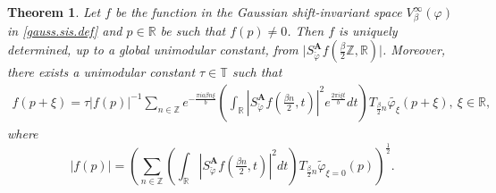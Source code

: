 \documentclass[11pt, reqno]{amsart}
\newtheorem{theorem}{Theorem}[section]
\newcommand{\Z}{\mathbb{Z}}
\newcommand{\R}{\mathbb{R}}
\newcommand{\T}{\mathbb{T}}
\numberwithin{equation}{section}
\begin{document}
\begin{theorem}\label{pr.gassian.thm1}
	Let $f$ be the function in the Gaussian shift-invariant space $V_{\beta}^{\infty}(\varphi)$ in \eqref{gauss.sis.def} and  $p\in \R$ be such that $f(p)\ne 0$. Then $f$ is uniquely determined, up to a global unimodular constant, from $
	\big|S_{\check{\varphi}}^{\mathbf{A}} f(\tfrac{\beta }{2} \Z,\R)\big|$.  
	Moreover, there exists a unimodular constant $\tau\in \T$ such that
	\begin{align*}
		f(p+\xi)
		=
		\tau |f(p)|^{-1}
		\sum_{n\in \Z}
		e^{-\frac{\pi ia\beta n\xi}{b}}
		\left(\int_{\R} |S_{\check{\varphi}}^{\mathbf{A}} f(\tfrac{\beta  n}{2},t)|^2 e^{\frac{2\pi i \xi t}{b}} dt \right)
		T_{\frac{\beta}{2}n} \widetilde{\varphi_\xi }(p+\xi), \ \xi\in \R,
	\end{align*}
	where
	\begin{equation}\label{abs.f.ed}
		|f(p)|
		=
		\left(
		\sum_{n\in \Z}
		\left(\int_{\R} |S_{\check{\varphi}}^{\mathbf{A}} f(\tfrac{\beta  n}{2},t)|^2 dt \right)
		T_{\frac{\beta}{2}n} \widetilde{\varphi}_{\xi=0}(p)
		\right)^{\frac{1}{2}}.
	\end{equation}
\end{theorem}
\end{document}
